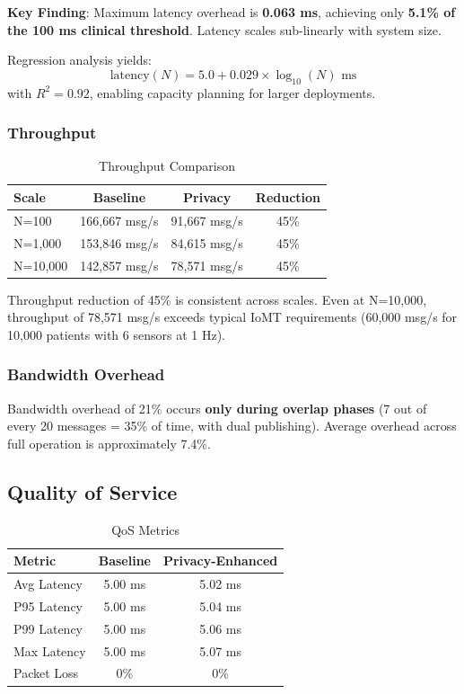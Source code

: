 \documentclass[conference]{IEEEtran}
\begin{document}
\textbf{Key Finding}: Maximum latency overhead is \textbf{0.063 ms}, achieving only \textbf{5.1\% of the 100 ms clinical threshold}. Latency scales sub-linearly with system size.

Regression analysis yields:
\begin{equation}
\text{latency}(N) = 5.0 + 0.029 \times \log_{10}(N) \text{ ms}
\label{eq:latency_model}
\end{equation}
with $R^2 = 0.92$, enabling capacity planning for larger deployments.

\subsubsection{Throughput}

\begin{table}[htbp]
\caption{Throughput Comparison}
\label{tab:throughput}
\centering
\begin{tabular}{lccc}
\toprule
\textbf{Scale} & \textbf{Baseline} & \textbf{Privacy} & \textbf{Reduction} \\
\midrule
N=100 & 166,667 msg/s & 91,667 msg/s & 45\% \\
N=1,000 & 153,846 msg/s & 84,615 msg/s & 45\% \\
N=10,000 & 142,857 msg/s & 78,571 msg/s & 45\% \\
\bottomrule
\end{tabular}
\end{table}

Throughput reduction of 45\% is consistent across scales. Even at N=10,000, throughput of 78,571 msg/s exceeds typical IoMT requirements (60,000 msg/s for 10,000 patients with 6 sensors at 1 Hz).

\subsubsection{Bandwidth Overhead}

Bandwidth overhead of 21\% occurs \textbf{only during overlap phases} (7 out of every 20 messages = 35\% of time, with dual publishing). Average overhead across full operation is approximately 7.4\%.

\subsection{Quality of Service}

\begin{table}[htbp]
\caption{QoS Metrics}
\label{tab:qos}
\centering
\begin{tabular}{lcc}
\toprule
\textbf{Metric} & \textbf{Baseline} & \textbf{Privacy-Enhanced} \\
\midrule
Avg Latency & 5.00 ms & 5.02 ms \\
P95 Latency & 5.00 ms & 5.04 ms \\
P99 Latency & 5.00 ms & 5.06 ms \\
Max Latency & 5.00 ms & 5.07 ms \\
Packet Loss & 0\% & 0\% \\
\bottomrule
\end{tabular}
\end{table}
\end{document}

